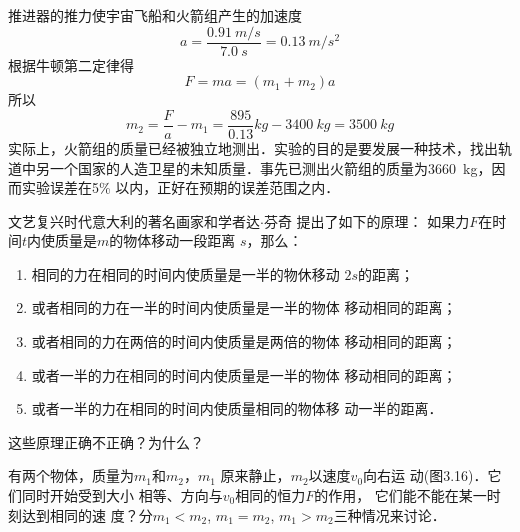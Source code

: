 \begin{Test}
\begin{QsNum}
          \begin{Answer}
              推进器的推力使宇宙飞船和火箭组产生的加速度
              \[a=\frac{\SI{0.91}{m/s}}{\SI{7.0}{s}}=\SI{0.13}{m/s^2} \]
              根据牛顿第二定律得
              \[F=ma=(m_1+m_2)a \]
              所以
              \[m_2=\frac{F}{a}-m_1=\frac{895}{0.13}\si{kg}-\SI{3400}{kg}=\SI{3500}{kg} \]
              实际上，火箭组的质量已经被独立地测出．实验的目的是要发展一种技术，找出轨道中另一个国家的人造卫星的未知质量．事先已测出火箭组的质量为\SI{3660}{kg}，因而实验误差在5\% 以内，正好在预期的误差范围之内．
          \end{Answer}

    \item 文艺复兴时代意大利的著名画家和学者达$\cdot$芬奇
          提出了如下的原理：
          如果力$F$在时间$t$内使质量是$m$的物体移动一段距离
          $s$，那么：

          \begin{minipage}[b]{1\textwidth}
              \begin{enumerate}
                  \item 相同的力在相同的时间内使质量是一半的物休移动
                        $2s$的距离；
                  \item   或者相同的力在一半的时间内使质量是一半的物体
                        移动相同的距离；
                  \item   或者相同的力在两倍的时间内使质量是两倍的物体
                        移动相同的距离；
                  \item   或者一半的力在相同的时间内使质量是一半的物体
                        移动相同的距离；
                  \item   或者一半的力在相同的时间内使质量相同的物体移
                        动一半的距离．
              \end{enumerate}
          \end{minipage}

          这些原理正确不正确？为什么？

    \item    有两个物体，质量为$m_1$和$m_2$，$m_1$
          原来静止，$m_2$以速度$v_0$向右运
          动(图3.16)．它们同时开始受到大小
          相等、方向与$v_0$相同的恒力$F$的作用，
          它们能不能在某一时刻达到相同的速
          度？分$m_1<m_2$, $m_1=m_2$, $m_1>m_2$三种情况来讨论．
          \begin{figure}[H]\centering
              \caption{}
          \end{figure}
\end{QsNum}



\end{Test}
